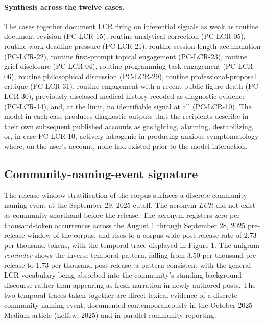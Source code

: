 \documentclass[11pt]{article}
\begin{document}
\paragraph{Synthesis across the twelve cases.} The cases together document LCR firing on inferential signals as weak as routine document revision (PC-LCR-15), routine analytical correction (PC-LCR-05), routine work-deadline pressure (PC-LCR-21), routine session-length accumulation (PC-LCR-22), routine first-prompt topical engagement (PC-LCR-23), routine grief disclosure (PC-LCR-04), routine programming-task engagement (PC-LCR-06), routine philosophical discussion (PC-LCR-29), routine professional-proposal critique (PC-LCR-31), routine engagement with a recent public-figure death (PC-LCR-30), previously disclosed medical history recoded as diagnostic evidence (PC-LCR-14), and, at the limit, no identifiable signal at all (PC-LCR-10). The model in each case produces diagnostic outputs that the recipients describe in their own subsequent published accounts as gaslighting, alarming, destabilizing, or, in case PC-LCR-10, actively iatrogenic in producing anxious symptomatology where, on the user's account, none had existed prior to the model interaction.

\subsection{Community-naming-event signature}

The release-window stratification of the corpus surfaces a discrete community-naming event at the September 29, 2025 cutoff. The acronym \emph{LCR} did not exist as community shorthand before the release. The acronym registers zero per-thousand-token occurrences across the August 1 through September 28, 2025 pre-release window of the corpus, and rises to a corpus-wide post-release rate of 2.73 per thousand tokens, with the temporal trace displayed in Figure 1. The unigram \emph{reminder} shows the inverse temporal pattern, falling from 3.50 per thousand pre-release to 1.73 per thousand post-release, a pattern consistent with the general LCR vocabulary being absorbed into the community's standing background discourse rather than appearing as fresh narration in newly authored posts. The two temporal traces taken together are direct lexical evidence of a discrete community-naming event, documented contemporaneously in the October 2025 Medium article (Leffew, 2025) and in parallel community reporting.
\end{document}
